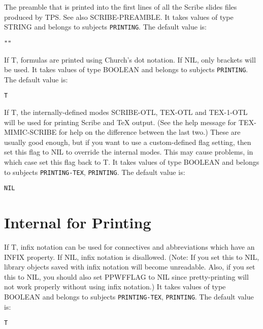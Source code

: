 \begin{description}
\item[SLIDES-PREAMBLE]  
The preamble that is printed into the first lines of all 
the Scribe slides files produced by TPS. See also SCRIBE-PREAMBLE.
It takes values of type STRING and belongs to subjects \texttt{PRINTING}.  The default value is: \begin{lstlisting}
""
\end{lstlisting}

\item[USE-DOT]  
If T, formulas are printed using Church's dot notation.
If NIL, only brackets will be used.
It takes values of type BOOLEAN and belongs to subjects \texttt{PRINTING}.  The default value is: \begin{lstlisting}
T
\end{lstlisting}

\item[USE-INTERNAL-PRINT-MODE]  
If T, the internally-defined modes SCRIBE-OTL,
TEX-OTL and TEX-1-OTL will be used for printing Scribe and
TeX output. (See the help message for TEX-MIMIC-SCRIBE for 
help on the difference between the last two.)
These are usually good enough, but if you want to use a 
custom-defined flag setting, then set this flag to NIL to
override the internal modes.  This may cause problems,
in which case set this flag back to T.
It takes values of type BOOLEAN and belongs to subjects \texttt{PRINTING-TEX}, \texttt{PRINTING}.  The default value is: \begin{lstlisting}
NIL
\end{lstlisting}

\item
\end{description}

\section{Internal for Printing}

\begin{description} 
\item[INFIX-NOTATION]  
If T, infix notation can be used for connectives and
abbreviations which have an INFIX property. If NIL, infix
notation is disallowed. (Note: If you set this to NIL, 
library objects saved with infix notation will become 
unreadable.  Also, if you set this to NIL, you should
also set PPWFFLAG to NIL since pretty-printing will 
not work properly without using infix notation.)
It takes values of type BOOLEAN and belongs to subjects \texttt{PRINTING-TEX}, \texttt{PRINTING}.  The default value is: \begin{lstlisting}
T
\end{lstlisting}

\item
\end{description}

